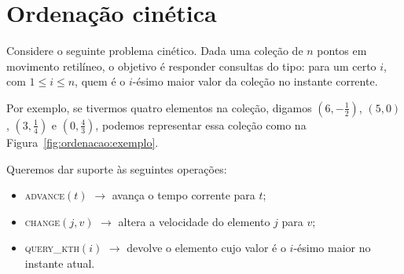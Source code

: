 


\chapter{Ordenação cinética}\label{ch:ordenacao-cinetica}
Considere o seguinte problema cinético.
Dada uma coleção de $n$ pontos em movimento retilíneo, o objetivo é responder consultas do tipo:
para um certo $i$, com $1 \leq i \leq n$, quem é o $i$-ésimo maior valor da coleção no instante corrente.


Por exemplo, se tivermos quatro elementos na coleção, digamos
$\left(6, -\frac{1}{2}\right)$, $(5, 0)$, $\left(3,
\frac{1}{4}\right)$ e $\left(0, \frac{4}{3}\right)$, podemos
representar essa coleção como na Figura~\ref{fig:ordenacao:exemplo}.



\newpage

Queremos dar suporte às seguintes operações:
\begin{itemize}
    \item \textsc{advance}$(t)$ $\rightarrow$ avança o tempo
    corrente para $t$;
    \item \textsc{change}$(j, v)$ $\rightarrow$ altera a
    velocidade do elemento $j$ para $v$;
    \item \textsc{query\_kth}$(i)$ $\rightarrow$ devolve o
    elemento cujo valor é o $i$-ésimo maior no instante atual.
\end{itemize}


